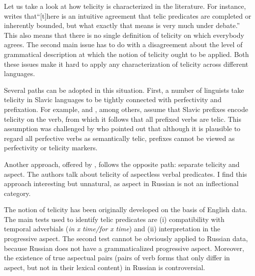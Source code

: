 Let us take a look at how telicity is characterized in the literature. For instance, \citet[3]{Rothstein:08a} writes that``[t]here is an intuitive agreement that telic predicates are completed or inherently bounded, but what exactly that means is very much under debate.'' This also means that there is no single definition of telicity on which everybody agrees. The second main issue has to do with a disagreement about the level of grammatical description at which the notion of telicity ought to be applied. Both these issues make it hard to apply any characterization of telicity across different languages. 

Several paths can be adopted in this situation. First, a number of linguists take telicity in Slavic languages to be tightly connected with perfectivity and prefixation. For example, \citet{Borer:03} and \citet{vanHout:08}, among others, assume that Slavic prefixes encode telicity on the verb, from which it follows that all prefixed verbs are telic. This assumption was challenged by \citet{Filip:03} who pointed out that although it is plausible to regard all perfective verbs as semantically telic, prefixes cannot be viewed as perfectivity or telicity markers.  

Another approach, offered by \citet{PaduchevaPentus:08}, follows the opposite path: separate telicity and aspect. The authors talk about telicity of aspectless verbal predicates. I find this approach interesting but unnatural, as aspect in Russian is not an inflectional category. 

The notion of telicity has been originally developed on the basis of English data. The main tests used to identify telic predicates are (i) compatibility with temporal adverbials (\textit{in x time/for x time}) and (ii) interpretation in the progressive aspect. The second test cannot be obviously applied to Russian data, because Russian does not have a grammaticalized progressive aspect. Moreover, the existence of true aspectual pairs (pairs of verb forms that only differ in aspect, but not in their lexical content) in Russian is controversial.

